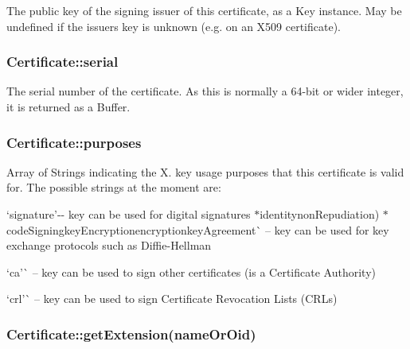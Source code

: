 The public key of the signing issuer of this certificate, as a {\ttfamily Key} instance. May be {\ttfamily undefined} if the issuer\textquotesingle{}s key is unknown (e.\+g. on an X509 certificate).

\subsubsection*{{\ttfamily Certificate\+::serial}}

The serial number of the certificate. As this is normally a 64-\/bit or wider integer, it is returned as a Buffer.

\subsubsection*{{\ttfamily Certificate\+::purposes}}

Array of Strings indicating the X. key usage purposes that this certificate is valid for. The possible strings at the moment are\+:


\begin{DoxyItemize}
\item `\textquotesingle{}signature'{\ttfamily -\/-\/ key can be used for digital signatures $\ast$}\textquotesingle{}identitynon\+Repudiation{\ttfamily ) $\ast$}\textquotesingle{}code\+Signing\textquotesingle{}key\+Encryption\textquotesingle{}encryption\textquotesingle{}key\+Agreement\textquotesingle{}\`{} -- key can be used for key exchange protocols such as Diffie-\/\+Hellman
\item `\textquotesingle{}ca'\`{} -- key can be used to sign other certificates (is a Certificate Authority)
\item `\textquotesingle{}crl'\`{} -- key can be used to sign Certificate Revocation Lists (C\+R\+Ls)
\end{DoxyItemize}

\subsubsection*{{\ttfamily Certificate\+::get\+Extension(name\+Or\+Oid)}}


